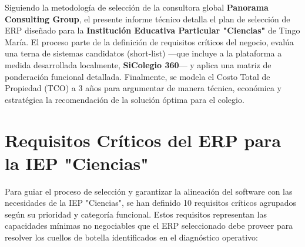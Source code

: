 \documentclass[12pt,a4paper,oneside]{report}
\begin{document}
Siguiendo la metodología de selección de la consultora global \textbf{Panorama Consulting Group}, el presente informe técnico detalla el plan de selección de ERP diseñado para la \textbf{Institución Educativa Particular "Ciencias"} de Tingo María. El proceso parte de la definición de requisitos críticos del negocio, evalúa una terna de sistemas candidatos (short-list) —que incluye a la plataforma a medida desarrollada localmente, \textbf{SiColegio 360}— y aplica una matriz de ponderación funcional detallada. Finalmente, se modela el Costo Total de Propiedad (TCO) a 3 años para argumentar de manera técnica, económica y estratégica la recomendación de la solución óptima para el colegio.

\newpage


\section{Requisitos Críticos del ERP para la IEP "Ciencias"}

Para guiar el proceso de selección y garantizar la alineación del software con las necesidades de la IEP "Ciencias", se han definido 10 requisitos críticos agrupados según su prioridad y categoría funcional. Estos requisitos representan las capacidades mínimas no negociables que el ERP seleccionado debe proveer para resolver los cuellos de botella identificados en el diagnóstico operativo:
\end{document}
